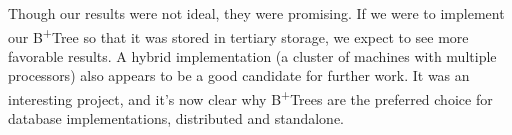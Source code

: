 \documentclass[conference]{IEEEtran}
\begin{document}
Though our results were not ideal, they were promising. If we were to implement
our B\textsuperscript{+}Tree so that it was stored in tertiary storage, we
expect to see more favorable results. A hybrid implementation (a cluster of
machines with multiple processors) also appears to be a good candidate for
further work. It was an interesting project, and it's now clear why
B\textsuperscript{+}Trees are the preferred choice for database
implementations, distributed and standalone.





%
%
%




\end{document}
